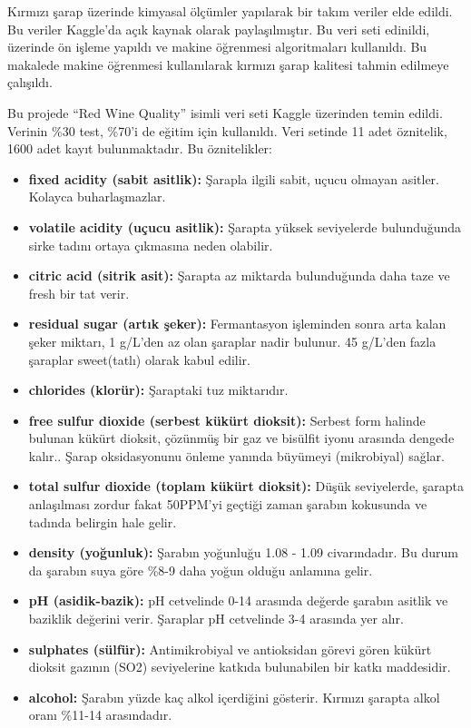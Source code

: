\documentclass[conference]{IEEEtran}
\begin{document}
\quad Kırmızı şarap üzerinde kimyasal ölçümler yapılarak bir takım veriler elde edildi. Bu veriler Kaggle\cite{4}'da açık kaynak olarak paylaşılmıştır. Bu veri seti edinildi, üzerinde ön işleme yapıldı ve makine öğrenmesi algoritmaları kullanıldı. Bu makalede makine öğrenmesi kullanılarak kırmızı şarap kalitesi tahmin edilmeye çalışıldı.

\newpage

\quad Bu projede “Red Wine Quality” isimli veri seti\cite{4} Kaggle üzerinden temin edildi. Verinin \%30 test, \%70’i de eğitim için kullanıldı. Veri setinde 11 adet öznitelik, 1600 adet kayıt bulunmaktadır. Bu öznitelikler:

\begin{itemize}
  \item \textbf{fixed acidity (sabit asitlik): } Şarapla ilgili sabit, uçucu olmayan asitler. Kolayca buharlaşmazlar\cite{5}.
  \item \textbf{volatile acidity (uçucu asitlik): } Şarapta yüksek seviyelerde bulunduğunda sirke tadını ortaya çıkmasına neden olabilir\cite{5}.
  \item \textbf{citric acid (sitrik asit): } Şarapta az miktarda bulunduğunda daha taze ve fresh bir tat verir\cite{5}.
  \item \textbf{residual sugar (artık şeker): } Fermantasyon işleminden sonra arta kalan şeker miktarı, 1 g/L’den az olan şaraplar nadir bulunur. 45 g/L’den fazla şaraplar sweet(tatlı) olarak kabul edilir\cite{5}.
  \item \textbf{chlorides (klorür): } Şaraptaki tuz miktarıdır\cite{5}.
  \item \textbf{free sulfur dioxide (serbest kükürt dioksit): } Serbest form halinde bulunan kükürt dioksit, çözünmüş bir gaz ve bisülfit iyonu arasında dengede kalır.. Şarap oksidasyonunu önleme yanında büyümeyi (mikrobiyal) sağlar\cite{5}.
  \item \textbf{total sulfur dioxide (toplam kükürt dioksit): } Düşük seviyelerde, şarapta anlaşılması zordur fakat 50PPM’yi geçtiği zaman şarabın kokusunda ve tadında belirgin hale gelir\cite{5}.
  \item \textbf{density (yoğunluk): } Şarabın yoğunluğu 1.08 - 1.09 civarındadır. Bu durum da şarabın suya göre \%8-9 daha yoğun olduğu anlamına gelir\cite{6}.
  \item \textbf{pH (asidik-bazik): } pH cetvelinde 0-14 arasında değerde  şarabın asitlik ve baziklik değerini verir. Şaraplar pH cetvelinde 3-4 arasında yer alır\cite{5}.
  \item \textbf{sulphates (sülfür): } Antimikrobiyal ve antioksidan görevi gören kükürt dioksit gazının (SO2) seviyelerine katkıda bulunabilen bir katkı maddesidir\cite{5}.
  \item \textbf{alcohol: } Şarabın yüzde kaç alkol içerdiğini gösterir. Kırmızı şarapta alkol oranı \%11-14 arasındadır\cite{5}.
\end{itemize}
\end{document}
